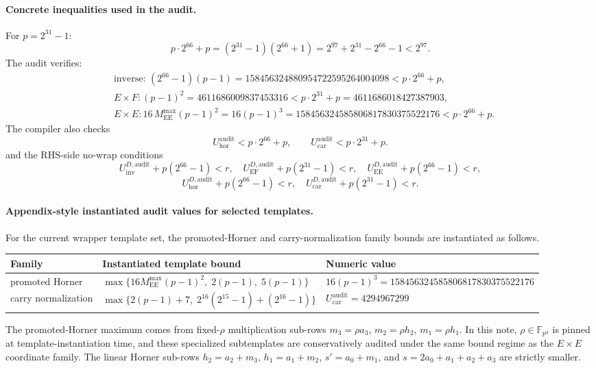 ﻿\documentclass[11pt]{article}
\newcommand{\Ep}{\mathbb{F}_{p^4}}
\begin{document}
\paragraph{Concrete inequalities used in the audit.}
For \(p=2^{31}-1\):
\[
p\cdot 2^{66}+p
=
(2^{31}-1)(2^{66}+1)
=
2^{97}+2^{31}-2^{66}-1
<
2^{97}.
\]
The audit verifies:
\begin{align*}
&\text{inverse: } (2^{66}-1)(p-1)=158456324880954722595264004098 < p\cdot 2^{66}+p,\\
&E\times F: (p-1)^2=4611686009837453316 < p\cdot 2^{31}+p = 4611686018427387903,\\
&E\times E: 16\,M_{\mathrm{EE}}^{\max}(p-1)^2
=16(p-1)^3
=158456324585806817830375522176
< p\cdot 2^{66}+p.
\end{align*}
The compiler also checks
\[
U_{\mathrm{hor}}^{\mathrm{audit}} < p\cdot 2^{66}+p,
\qquad
U_{\mathrm{car}}^{\mathrm{audit}} < p\cdot 2^{31}+p.
\]
and the RHS-side no-wrap conditions
\[
U_{\mathrm{inv}}^{D,\mathrm{audit}}+p(2^{66}-1)<r,\quad
U_{\mathrm{EF}}^{D,\mathrm{audit}}+p(2^{31}-1)<r,\quad
U_{\mathrm{EE}}^{D,\mathrm{audit}}+p(2^{66}-1)<r,
\]
\[
U_{\mathrm{hor}}^{D,\mathrm{audit}}+p(2^{66}-1)<r,\quad
U_{\mathrm{car}}^{D,\mathrm{audit}}+p(2^{31}-1)<r.
\]

\paragraph{Appendix-style instantiated audit values for selected templates.}
For the current wrapper template set, the promoted-Horner and
carry-normalization family bounds are
instantiated as follows.
\begin{center}
\begin{tabular}{|l|l|l|}
\hline
Family & Instantiated template bound & Numeric value \\
\hline
promoted Horner &
\(
\max\!\{16M_{\mathrm{EE}}^{\max}(p-1)^2,\;2(p-1),\;5(p-1)\}
\) &
\(16(p-1)^3=158456324585806817830375522176\) \\
\hline
carry normalization &
\(
\max\!\{2(p-1)+7,\;2^{16}(2^{15}-1)+(2^{16}-1)\}
\) &
\(U_{\mathrm{car}}^{\mathrm{audit}}=4294967299\) \\
\hline
\end{tabular}
\end{center}

The promoted-Horner maximum comes from fixed-\(\rho\) multiplication sub-rows
\(m_3=\rho a_3\), \(m_2=\rho h_2\), \(m_1=\rho h_1\). In this note,
\(\rho\in\Ep\) is pinned at template-instantiation time, and these specialized
subtemplates are conservatively audited under the same bound regime as the
\(E\times E\) coordinate family. The linear Horner sub-rows
\(h_2=a_2+m_3\), \(h_1=a_1+m_2\), \(s'=a_0+m_1\), and
\(s=2a_0+a_1+a_2+a_3\) are strictly smaller.
\end{document}
